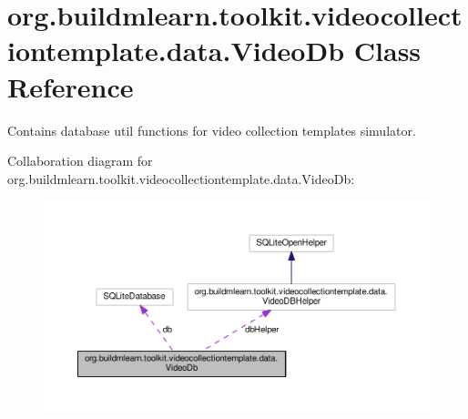 \hypertarget{classorg_1_1buildmlearn_1_1toolkit_1_1videocollectiontemplate_1_1data_1_1VideoDb}{}\section{org.\+buildmlearn.\+toolkit.\+videocollectiontemplate.\+data.\+Video\+Db Class Reference}
\label{classorg_1_1buildmlearn_1_1toolkit_1_1videocollectiontemplate_1_1data_1_1VideoDb}


Contains database util functions for video collection template\textquotesingle{}s simulator.  




Collaboration diagram for org.\+buildmlearn.\+toolkit.\+videocollectiontemplate.\+data.\+Video\+Db\+:
\nopagebreak
\begin{figure}[H]
\begin{center}
\leavevmode
\includegraphics[width=350pt]{classorg_1_1buildmlearn_1_1toolkit_1_1videocollectiontemplate_1_1data_1_1VideoDb__coll__graph}
\end{center}
\end{figure}
